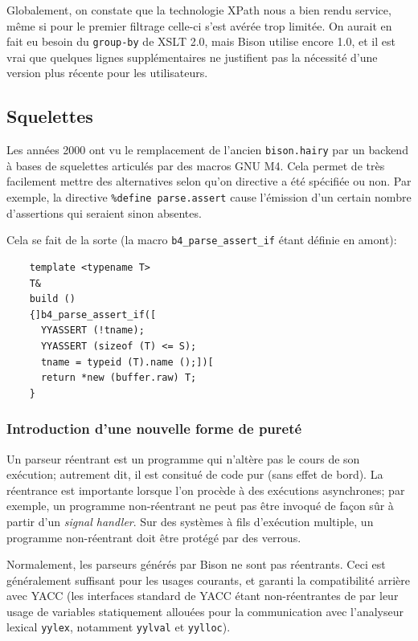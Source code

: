 \documentclass[a4paper,11pt,twoside,final]{article}
\begin{document}
  Globalement, on constate que la technologie XPath nous a bien rendu service,
  même si pour le premier filtrage celle-ci s'est avérée trop limitée. On
  aurait en fait eu besoin du \texttt{group-by} de XSLT 2.0, mais Bison utilise
  encore 1.0, et il est vrai que quelques lignes supplémentaires ne justifient
  pas la nécessité d'une version plus récente pour les utilisateurs.

  \cleardoublepage

  \subsection{Squelettes}

  Les années 2000 ont vu le remplacement de l'ancien \texttt{bison.hairy} par
  un backend à bases de squelettes articulés par des macros GNU M4. Cela permet
  de très facilement mettre des alternatives selon qu'on directive a été
  spécifiée ou non. Par exemple, la directive \texttt{\%define parse.assert}
  cause l'émission d'un certain nombre d'assertions qui seraient sinon
  absentes.

  Cela se fait de la sorte (la macro \texttt{b4\_parse\_assert\_if} étant
  définie en amont):

  \begin{verbatim}
    template <typename T>
    T&
    build ()
    {]b4_parse_assert_if([
      YYASSERT (!tname);
      YYASSERT (sizeof (T) <= S);
      tname = typeid (T).name ();])[
      return *new (buffer.raw) T;
    }
  \end{verbatim}

  \subsubsection{Introduction d'une nouvelle forme de pureté}

  Un parseur réentrant est un programme qui n'altère pas le cours de son
  exécution; autrement dit, il est consitué de code pur (sans effet de bord).
  La réentrance est importante lorsque l'on procède à des exécutions
  asynchrones; par exemple, un programme non-réentrant ne peut pas être invoqué
  de façon sûr à partir d'un \textit{signal handler}. Sur des systèmes à fils
  d'exécution multiple, un programme non-réentrant doit être protégé par des
  verrous.

  Normalement, les parseurs générés par Bison ne sont pas réentrants. Ceci est
  généralement suffisant pour les usages courants, et garanti la compatibilité
  arrière avec YACC (les interfaces standard de YACC étant non-réentrantes de
  par leur usage de variables statiquement allouées pour la communication avec
  l'analyseur lexical \texttt{yylex}, notamment \texttt{yylval} et
  \texttt{yylloc}).
\end{document}
